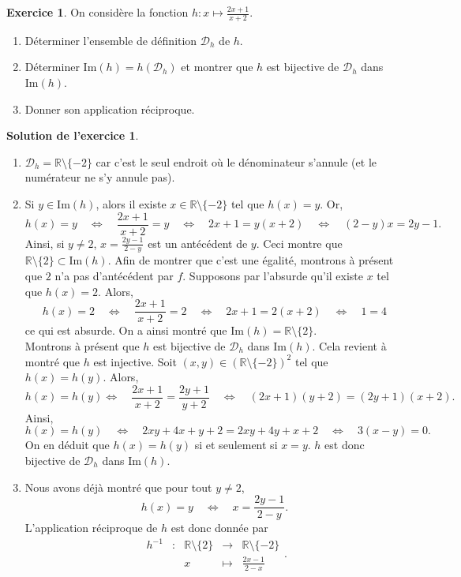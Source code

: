 \documentclass[a4paper, 11pt,openany]{article}%
\theoremstyle{plain}
\theoremstyle{definition}
\newtheorem{exo}{Exercice}
\newtheorem{sol}{Solution de l'exercice}
\theoremstyle{remark}
\newcommand{\R}{\mathbb{R}}
\newcommand{\calD}{\mathcal{D}}
\newcommand{\im}{\text{Im}}
\begin{document}
\begin{exo}
On considère la fonction
$\displaystyle{h : x \mapsto \frac{2x+1}{x+2}}$.
\begin{enumerate}
\item Déterminer l'ensemble de définition $\calD_h$ de $h$.
\item Déterminer $\im(h) = h(\calD_h)$ et montrer que $h$ est bijective de $\calD_h$ dans $\im(h)$.
\item Donner son application réciproque.
\end{enumerate}
\end{exo}

\begin{sol}
\begin{enumerate}
\item $\calD_h = \R \setminus \{-2\}$ car c'est le seul endroit où le dénominateur s'annule (et le numérateur ne s'y annule pas).
\item Si $y \in \im(h)$, alors il existe $x \in \R \setminus \{-2\}$ tel que $h(x) = y$. Or,
\[h(x) = y \quad \Leftrightarrow \quad \frac{2x+1}{x+2} = y \quad \Leftrightarrow \quad 2x+1 = y(x+2) \quad \Leftrightarrow \quad (2-y)x = 2y-1.\]
Ainsi, si $y \neq 2$, $x = \frac{2y-1}{2-y}$ est un antécédent de $y$. Ceci montre que $\R \setminus \{2\} \subset \im(h)$. Afin de montrer que c'est une égalité, montrons à présent que $2$ n'a pas d'antécédent par $f$. Supposons par l'absurde qu'il existe $x$ tel que $h(x) = 2$. Alors,
\[ h(x) = 2 \quad \Leftrightarrow \quad \frac{2x+1}{x+2} =2 \quad \Leftrightarrow \quad 2x+1 = 2(x+2) \quad \Leftrightarrow \quad 1 = 4\]
ce qui est absurde. On a ainsi montré que $\im(h) = \R \setminus \{2\}$.\\
Montrons à présent que $h$ est bijective de $\calD_h$ dans $\im(h)$. Cela revient à montré que $h$ est injective. Soit $(x,y) \in (\R \setminus \{-2\})^2$ tel que $h(x) = h(y)$. Alors,
\[h(x) = h(y) \Leftrightarrow \quad \frac{2x+1}{x+2} = \frac{2y+1}{y+2} \quad \Leftrightarrow \quad (2x+1)(y+2) = (2y+1)(x+2).\]
Ainsi,
\[ h(x) = h(y) \quad \Leftrightarrow \quad 2xy + 4x + y + 2 = 2xy + 4y + x + 2 \quad \Leftrightarrow \quad   3(x-y)  = 0 .\]
On en déduit que $h(x) = h(y)$ si et seulement si $x =y$. $h$ est donc bijective de $\calD_h$ dans $\im(h)$.
\item Nous avons déjà montré que pour tout $y \neq 2$,
\[h(x) = y \quad \Leftrightarrow \quad x = \frac{2y-1}{2-y}.\]
L'application réciproque de $h$ est donc donnée par
\[  \begin{array}{ccccc}
h^{-1} & : & \R \setminus \{2\} & \to & \R \setminus \{-2\} \\
 & & x & \mapsto & \frac{2x-1}{2-x}
\end{array}.\]
\end{enumerate}
\end{sol}
\end{document}
